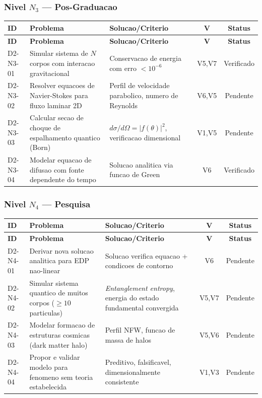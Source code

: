 \subsubsection{Nivel $N_3$ --- Pos-Graduacao}

\begin{longtable}{|p{2.0cm}|p{4.2cm}|p{4.2cm}|c|c|}
\hline
\textbf{ID} & \textbf{Problema} & \textbf{Solucao/Criterio} & \textbf{V} & \textbf{Status} \\
\hline
\endfirsthead
\hline
\textbf{ID} & \textbf{Problema} & \textbf{Solucao/Criterio} & \textbf{V} & \textbf{Status} \\
\hline
\endhead
\hline
\endfoot
D2-N3-01 & Simular sistema de $N$ corpos com interacao gravitacional & Conservacao de energia com erro $<10^{-6}$ & V5,V7 & Verificado \\
\hline
D2-N3-02 & Resolver equacoes de Navier-Stokes para fluxo laminar 2D & Perfil de velocidade parabolico, numero de Reynolds & V6,V5 & Pendente \\
\hline
D2-N3-03 & Calcular secao de choque de espalhamento quantico (Born) & $d\sigma/d\Omega=|f(\theta)|^{2}$, verificacao dimensional & V1,V5 & Pendente \\
\hline
D2-N3-04 & Modelar equacao de difusao com fonte dependente do tempo & Solucao analitica via funcao de Green & V6 & Verificado \\
\hline
\end{longtable}

\subsubsection{Nivel $N_4$ --- Pesquisa}

\begin{longtable}{|p{2.0cm}|p{4.2cm}|p{4.2cm}|c|c|}
\hline
\textbf{ID} & \textbf{Problema} & \textbf{Solucao/Criterio} & \textbf{V} & \textbf{Status} \\
\hline
\endfirsthead
\hline
\textbf{ID} & \textbf{Problema} & \textbf{Solucao/Criterio} & \textbf{V} & \textbf{Status} \\
\hline
\endhead
\hline
\endfoot
D2-N4-01 & Derivar nova solucao analitica para EDP nao-linear & Solucao verifica equacao + condicoes de contorno & V6 & Pendente \\
\hline
D2-N4-02 & Simular sistema quantico de muitos corpos ($\geq 10$ particulas) & \textit{Entanglement entropy}, energia do estado fundamental convergida & V5,V7 & Pendente \\
\hline
D2-N4-03 & Modelar formacao de estruturas cosmicas (dark matter halo) & Perfil NFW, funcao de massa de halos & V5,V6 & Pendente \\
\hline
D2-N4-04 & Propor e validar modelo para fenomeno sem teoria estabelecida & Preditivo, falsificavel, dimensionalmente consistente & V1,V3 & Pendente \\
\hline
\end{longtable}


